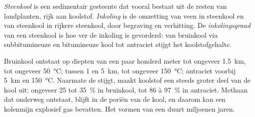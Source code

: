 \begin{definition}\label{def:g11:fossil-fuel-geology:coal}
\emph{Steenkool} is een sedimentair gesteente dat vooral bestaat uit de resten van
landplanten, rijk aan koolstof. \emph{Inkoling} is de
omzetting van veen in steenkool en van steenkool in rijkere steenkool, door begraving en
verhitting. De \emph{inkolingsgraad} van een steenkool is hoe ver
de inkoling is gevorderd: van bruinkool via subbitumineuze en bitumineuze
kool tot antraciet stijgt het koolstofgehalte.
\end{definition}

Bruinkool ontstaat op diepten van een paar honderd meter tot ongeveer \qty{1.5}{km},
tot ongeveer \qty{50}{\degreeCelsius};  tussen 1 en
\qty{5}{km}, tot ongeveer \qty{150}{\degreeCelsius}; antraciet voorbij
\qty{5}{km} en \qty{150}{\degreeCelsius}. Naarmate de  stijgt, maakt koolstof
een steeds groter deel van de kool uit: ongeveer
25 tot \qty{35}{\percent} in bruinkool, tot 86 à \qty{97}{\percent} in
antraciet. Methaan dat onderweg ontstaat, blijft in de poriën van de kool, en
daarom kan een kolenmijn explosief gas bevatten. Het vormen van een  duurt miljoenen
jaren.

